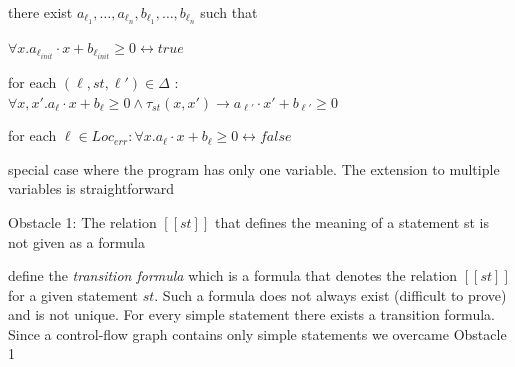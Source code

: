 \documentclass[landscape, a4paper]{article}
\begin{document}
\begin{minipage}[t]{0.2\linewidth}
\begin{betterlist}
\begin{betterlist}
\begin{betterlist}
			\end{betterlist}
			\item there exist $a_{\ell_1},\ldots, a_{\ell_n}, b_{\ell_1},\ldots, b_{\ell_n}$ such that
			\begin{betterlist}
				\item $\forall x. a_{\ell_{init}} \cdot  x + b_{\ell_{init}} \geq 0 \leftrightarrow true$
				\item for each $(\ell, st, \ell') \in \Delta$ : $\forall x, x' . a_{\ell} \cdot  x + b_{\ell} \geq 0 \land \tau_{st}(x, x') \rightarrow a_{\ell'} \cdot x' + b_{\ell'} \geq 0$
				\item for each $\ell \in Loc_{err} : \forall x. a_{\ell} \cdot  x + b_{\ell} \geq 0 \leftrightarrow false$
				\item special case where the program has only one variable. The extension to multiple variables is straightforward
			\end{betterlist}
		\end{betterlist}
		\item \alert{Obstacle 1:} The relation $[[st]]$ that defines the meaning of a statement st is not given as a formula
		\begin{betterlist}
			\item define the \textit{transition formula} which is a formula that denotes the relation $[[st]]$ for a given statement $st$. Such a formula does not always exist (difficult to prove) and is not unique. For every simple statement there exists a transition formula. Since a control-flow graph contains only simple statements we overcame Obstacle 1
		\end{betterlist}
	\end{betterlist}
\end{minipage}
\end{document}

